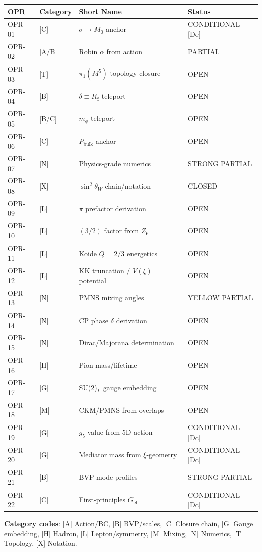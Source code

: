 \begin{center}
\small
\begin{tabular}{@{}llll@{}}
\toprule
OPR & Category & Short Name & Status \\
\midrule
OPR-01 & [C] & $\sigma \to M_0$ anchor & CONDITIONAL [Dc] \\
OPR-02 & [A/B] & Robin $\alpha$ from action & PARTIAL \\
OPR-03 & [T] & $\pi_1(M^5)$ topology closure & OPEN \\
OPR-04 & [B] & $\delta \equiv R_\xi$ teleport & OPEN \\
OPR-05 & [B/C] & $m_\phi$ teleport & OPEN \\
OPR-06 & [C] & $P_{\text{bulk}}$ anchor & OPEN \\
OPR-07 & [N] & Physics-grade numerics & STRONG PARTIAL \\
OPR-08 & [X] & $\sin^2\theta_W$ chain/notation & CLOSED \\
OPR-09 & [L] & $\pi$ prefactor derivation & OPEN \\
OPR-10 & [L] & $(3/2)$ factor from $Z_6$ & OPEN \\
OPR-11 & [L] & Koide $Q = 2/3$ energetics & OPEN \\
OPR-12 & [L] & KK truncation / $V(\xi)$ potential & OPEN \\
OPR-13 & [N] & PMNS mixing angles & YELLOW PARTIAL \\
OPR-14 & [N] & CP phase $\delta$ derivation & OPEN \\
OPR-15 & [N] & Dirac/Majorana determination & OPEN \\
OPR-16 & [H] & Pion mass/lifetime & OPEN \\
OPR-17 & [G] & SU(2)$_L$ gauge embedding & OPEN \\
OPR-18 & [M] & CKM/PMNS from overlaps & OPEN \\
OPR-19 & [G] & $g_5$ value from 5D action & CONDITIONAL [Dc] \\
OPR-20 & [G] & Mediator mass from $\xi$-geometry & CONDITIONAL [Dc] \\
OPR-21 & [B] & BVP mode profiles & STRONG PARTIAL \\
OPR-22 & [C] & First-principles $G_{\text{eff}}$ & CONDITIONAL [Dc] \\
\bottomrule
\end{tabular}
\end{center}

\textbf{Category codes}: [A] Action/BC, [B] BVP/scales, [C] Closure chain,
[G] Gauge embedding, [H] Hadron, [L] Lepton/symmetry, [M] Mixing,
[N] Numerics, [T] Topology, [X] Notation.

